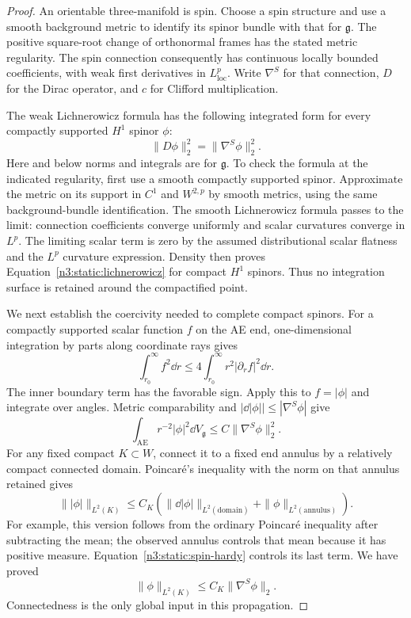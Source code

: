\begin{proof}
An orientable three-manifold is spin.
Choose a spin structure and use a smooth background metric to
identify its spinor bundle with that for \(\mathfrak g\).
The positive square-root change of orthonormal frames has the
stated metric regularity.
The spin connection consequently has continuous locally bounded
coefficients, with weak first derivatives in \(L^p_{\mathrm{loc}}\).
Write \(\nabla^S\) for that connection, \(D\) for the Dirac operator,
and \(c\) for Clifford multiplication.

The weak Lichnerowicz formula has the following integrated form for
every compactly supported \(H^1\) spinor \(\phi\):
\begin{equation}
\label{n3:static:lichnerowicz}
\|D\phi\|_2^2=\|\nabla^S\phi\|_2^2.
\end{equation}
Here and below norms and integrals are for \(\mathfrak g\).
To check the formula at the indicated regularity, first use a smooth
compactly supported spinor. Approximate the metric on its support
in \(C^1\) and \(W^{2,p}\) by smooth metrics, using the same
background-bundle identification.
The smooth Lichnerowicz formula passes to the limit: connection
coefficients converge uniformly and scalar curvatures converge
in \(L^p\).
The limiting scalar term is zero by the assumed distributional
scalar flatness and the \(L^p\) curvature expression.
Density then proves Equation~\eqref{n3:static:lichnerowicz} for compact
\(H^1\) spinors.
Thus no integration surface is retained around the compactified point.

We next establish the coercivity needed to complete compact spinors.
For a compactly supported scalar function \(f\) on the AE end,
one-dimensional integration by parts along coordinate rays gives
\begin{equation}
\label{n3:static:radial-hardy}
\int_{r_0}^\infty f^2\dd r
\leq4\int_{r_0}^\infty r^2|\partial_rf|^2\dd r.
\end{equation}
The inner boundary term has the favorable sign.
Apply this to \(f=|\phi|\) and integrate over angles.
Metric comparability and
\(|\dd|\phi||\leq|\nabla^S\phi|\) give
\begin{equation}
\label{n3:static:spin-hardy}
\int_{\mathrm{AE}}r^{-2}|\phi|^2\dd V_{\mathfrak g}
\leq C\|\nabla^S\phi\|_2^2.
\end{equation}
For any fixed compact \(K\subset W\), connect it to a fixed end
annulus by a relatively compact connected domain.
Poincaré's inequality with the norm on that annulus retained gives
\[
\||\phi|\|_{L^2(K)}
\leq C_K\left(
\|\dd|\phi|\|_{L^2(\text{domain})}
 +\|\phi\|_{L^2(\text{annulus})}\right).
\]
For example, this version follows from the ordinary Poincaré
inequality after subtracting the mean; the observed annulus
controls that mean because it has positive measure.
Equation~\eqref{n3:static:spin-hardy} controls its last term.
We have proved
\begin{equation}
\label{n3:static:local-coercivity}
\|\phi\|_{L^2(K)}\leq C_K\|\nabla^S\phi\|_2.
\end{equation}
Connectedness is the only global input in this propagation.


\end{proof}
